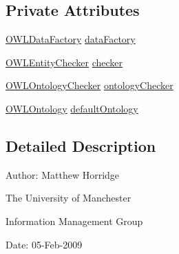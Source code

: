 \subsection*{Private Attributes}
\begin{DoxyCompactItemize}
\item 
\hyperlink{interfaceorg_1_1semanticweb_1_1owlapi_1_1model_1_1_o_w_l_data_factory}{O\-W\-L\-Data\-Factory} \hyperlink{classorg_1_1coode_1_1owlapi_1_1manchesterowlsyntax_1_1_manchester_o_w_l_syntax_frames_parser_ac1279a3b51760d439899bc88f8a582b9}{data\-Factory}
\item 
\hyperlink{interfaceorg_1_1semanticweb_1_1owlapi_1_1expression_1_1_o_w_l_entity_checker}{O\-W\-L\-Entity\-Checker} \hyperlink{classorg_1_1coode_1_1owlapi_1_1manchesterowlsyntax_1_1_manchester_o_w_l_syntax_frames_parser_a16f199b128971f84bd63c29c071d1a7c}{checker}
\item 
\hyperlink{interfaceorg_1_1semanticweb_1_1owlapi_1_1expression_1_1_o_w_l_ontology_checker}{O\-W\-L\-Ontology\-Checker} \hyperlink{classorg_1_1coode_1_1owlapi_1_1manchesterowlsyntax_1_1_manchester_o_w_l_syntax_frames_parser_a57f8a3b2bc3d83a145bac26a7c74c4eb}{ontology\-Checker}
\item 
\hyperlink{interfaceorg_1_1semanticweb_1_1owlapi_1_1model_1_1_o_w_l_ontology}{O\-W\-L\-Ontology} \hyperlink{classorg_1_1coode_1_1owlapi_1_1manchesterowlsyntax_1_1_manchester_o_w_l_syntax_frames_parser_a0eb7aa9b91cba2c493694f1b54d9fcbb}{default\-Ontology}
\end{DoxyCompactItemize}


\subsection{Detailed Description}
Author\-: Matthew Horridge\par
 The University of Manchester\par
 Information Management Group\par
 Date\-: 05-\/\-Feb-\/2009 

